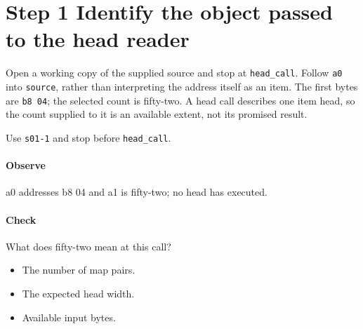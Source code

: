 \section{Step 1 Identify the object passed to the head reader}\label{cbor-s01}
Open a working copy of the supplied source and stop at \texttt{head\_call}. Follow \texttt{a0} into \texttt{source}, rather than interpreting the address itself as an item. The first bytes are \texttt{b8 04}; the selected count is fifty-two. A head call describes one item head, so the count supplied to it is an available extent, not its promised result.

Use \texttt{s01-1} and stop before \texttt{head\_call}.

\paragraph{Observe} a0 addresses b8 04 and a1 is fifty-two; no head has executed.

\paragraph{Check} What does fifty-two mean at this call?
\begin{itemize}
  \item[A.] The number of map pairs.
  \item[B.] The expected head width.
  \item[C.] Available input bytes.
\end{itemize}
